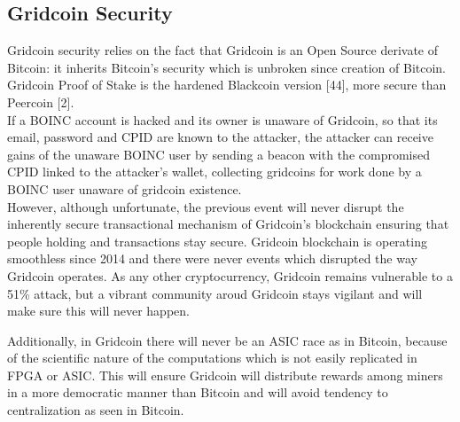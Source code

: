 \subsection{Gridcoin Security}

Gridcoin security relies on the fact that Gridcoin is an Open Source derivate of Bitcoin: it inherits Bitcoin's security which is unbroken since creation of Bitcoin. Gridcoin Proof of Stake is the hardened Blackcoin version [44], more secure than Peercoin [2].\\ 

If a BOINC account is hacked and its owner is unaware of Gridcoin, so that its email, password and CPID are known to the attacker, the attacker can receive gains of the unaware BOINC user by sending a beacon with the compromised CPID linked to the attacker's wallet, collecting gridcoins for work done by a BOINC user unaware of gridcoin existence.\\

However, although unfortunate, the previous event will never disrupt the inherently secure transactional mechanism of Gridcoin's blockchain ensuring that people holding and transactions stay secure. Gridcoin blockchain is operating smoothless since 2014 and there were never events which disrupted the way Gridcoin operates. As any other cryptocurrency, Gridcoin remains vulnerable to a 51\% attack, but a vibrant community aroud Gridcoin stays vigilant and will make sure this will never happen.

Additionally, in Gridcoin there will never be an ASIC race as in Bitcoin, because of the scientific nature of the computations which is not easily replicated in FPGA or ASIC. This will ensure Gridcoin will distribute rewards among miners in a more democratic manner than Bitcoin and will avoid tendency to centralization as seen in Bitcoin.